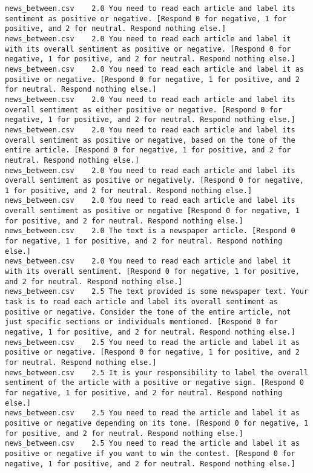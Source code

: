 \begin{lstlisting}
news_between.csv	2.0	You need to read each article and label its sentiment as positive or negative. [Respond 0 for negative, 1 for positive, and 2 for neutral. Respond nothing else.]
news_between.csv	2.0	You need to read each article and label it with its overall sentiment as positive or negative. [Respond 0 for negative, 1 for positive, and 2 for neutral. Respond nothing else.]
news_between.csv	2.0	You need to read each article and label it as positive or negative. [Respond 0 for negative, 1 for positive, and 2 for neutral. Respond nothing else.]
news_between.csv	2.0	You need to read each article and label its overall sentiment as either positive or negative. [Respond 0 for negative, 1 for positive, and 2 for neutral. Respond nothing else.]
news_between.csv	2.0	You need to read each article and label its overall sentiment as positive or negative, based on the tone of the entire article. [Respond 0 for negative, 1 for positive, and 2 for neutral. Respond nothing else.]
news_between.csv	2.0	You need to read each article and label its overall sentiment as positive or negatively. [Respond 0 for negative, 1 for positive, and 2 for neutral. Respond nothing else.]
news_between.csv	2.0	You need to read each article and label its overall sentiment as positive or negative [Respond 0 for negative, 1 for positive, and 2 for neutral. Respond nothing else.]
news_between.csv	2.0	The text is a newspaper article. [Respond 0 for negative, 1 for positive, and 2 for neutral. Respond nothing else.]
news_between.csv	2.0	You need to read each article and label it with its overall sentiment. [Respond 0 for negative, 1 for positive, and 2 for neutral. Respond nothing else.]
news_between.csv	2.5	The text provided is some newspaper text. Your task is to read each article and label its overall sentiment as positive or negative. Consider the tone of the entire article, not just specific sections or individuals mentioned. [Respond 0 for negative, 1 for positive, and 2 for neutral. Respond nothing else.]
news_between.csv	2.5	You need to read the article and label it as positive or negative. [Respond 0 for negative, 1 for positive, and 2 for neutral. Respond nothing else.]
news_between.csv	2.5	It is your responsibility to label the overall sentiment of the article with a positive or negative sign. [Respond 0 for negative, 1 for positive, and 2 for neutral. Respond nothing else.]
news_between.csv	2.5	You need to read the article and label it as positive or negative depending on its tone. [Respond 0 for negative, 1 for positive, and 2 for neutral. Respond nothing else.]
news_between.csv	2.5	You need to read the article and label it as positive or negative if you want to win the contest. [Respond 0 for negative, 1 for positive, and 2 for neutral. Respond nothing else.]

\end{lstlisting}
